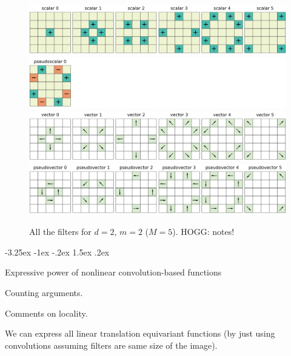 \documentclass{article}
\makeatletter
\theoremstyle{plain}
\renewcommand\section{\@startsection {section}{1}{\z@}%
  {-3.25ex \@plus -1ex \@minus -.2ex}%
  {1.5ex \@plus .2ex}%
  {\raggedright\normalfont\large\bfseries}}%
\makeatother
\begin{document}
\begin{figure}[tp]
  \begin{mdframed}
  \color{captiongray}
  \begin{center}
\includegraphics[width=\textwidth]{notebooks/filter+0_2_5.png}\\
\includegraphics[width=\textwidth]{notebooks/filter-0_2_5.png}\\
\includegraphics[width=\textwidth]{notebooks/filter+1_2_5.png}\\
\includegraphics[width=\textwidth]{notebooks/filter-1_2_5.png}
  \end{center}
\caption{All the filters for $d=2$, $m=2$ ($M=5$). HOGG: notes!\label{fig:filters25}}
  \end{mdframed}
\end{figure}

\section{Expressive power of nonlinear convolution-based functions}\label{sec:universality}

Counting arguments.

Comments on locality.

We can express all linear translation equivariant functions (by just using convolutions assuming filters are same size of the image). 
\end{document}
